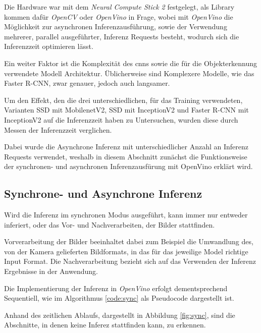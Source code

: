 Die Hardware war mit dem \textit{Neural Compute Stick 2}
festgelegt, als Library kommen dafür \textit{OpenCV}
oder \textit{OpenVino} in Frage, wobei mit
\textit{OpenVino} die Möglichkeit 
zur asynchronen Inferenzausführung, sowie der Verwendung mehrerer,
parallel ausgeführter, Inferenz Requests besteht,
wodurch sich die Inferenzzeit optimieren lässt.

Ein weiter Faktor ist die Komplexität des \Glspl{cnn} sowie die 
für die Objekterkennung verwendete Modell Architektur.
Üblicherweise sind Komplexere Modelle, wie das Faster R-CNN,
zwar genauer, jedoch auch langsamer.

Um den Effekt, den die drei unterschiedlichen, 
für das Training verwendeten, Varianten SSD mit MobilenetV2, 
SSD mit InceptionV2 und Faster R-CNN mit InceptionV2 auf die
Inferenzzeit haben zu Untersuchen,
wurden diese durch Messen der Inferenzzeit verglichen.

Dabei wurde die Asynchrone Inferenz mit unterschiedlicher Anzahl 
an Inferenz Requests verwendet, weshalb in diesem Abschnitt 
zunächst die Funktionsweise der synchronen- und asynchronen
Inferenzausfürung mit OpenVino erklärt wird.


\subsection{Synchrone- und Asynchrone Inferenz}

Wird die Inferenz im synchronen Modus ausgeführt, kann immer
nur entweder inferiert, oder das Vor- und 
Nachverarbeiten, der Bilder stattfinden.

Vorverarbeitung der Bilder beeinhaltet dabei
zum Beispiel die Umwandlung des, von der Kamera gelieferten 
Bildformats, in das für das jeweilige Model richtige 
Input Format.
Die Nachverarbeitung bezieht sich auf das Verwenden 
der Inferenz Ergebnisse in der Anwendung.

Die Implementierung der Inferenz in \textit{OpenVino} erfolgt
dementsprechend Sequentiell, wie im Algorithmus
\ref{code:sync} als Pseudocode dargestellt ist.

Anhand des zeitlichen Ablaufs, dargestellt in Abbildung
\ref{fig:sync}, sind die Abschnitte, in denen
keine Inferez stattfinden kann, zu erkennen.

